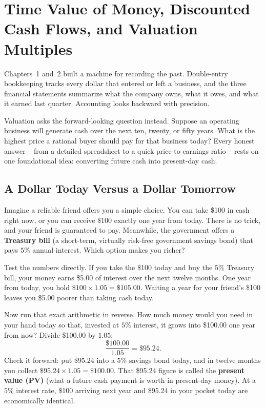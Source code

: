 \chapter{Time Value of Money, Discounted Cash Flows, and Valuation Multiples}
\label{ch:valuation-multiples}
\chapterline

Chapters~1 and~2 built a machine for recording the past. Double-entry bookkeeping tracks every dollar that entered or left a business, and the three financial statements summarize what the company owns, what it owes, and what it earned last quarter. Accounting looks backward with precision.

Valuation asks the forward-looking question instead. Suppose an operating business will generate cash over the next ten, twenty, or fifty years. What is the highest price a rational buyer should pay for that business today? Every honest answer -- from a detailed spreadsheet to a quick price-to-earnings ratio -- rests on one foundational idea: converting future cash into present-day cash.

\section{A Dollar Today Versus a Dollar Tomorrow}

Imagine a reliable friend offers you a simple choice. You can take \$100 in cash right now, or you can receive \$100 exactly one year from today. There is no trick, and your friend is guaranteed to pay. Meanwhile, the government offers a \textbf{Treasury bill} (a short-term, virtually risk-free government savings bond) that pays $5\%$ annual interest. Which option makes you richer?

Test the numbers directly. If you take the \$100 today and buy the $5\%$ Treasury bill, your money earns \$5.00 of interest over the next twelve months. One year from today, you hold $\$100 \times 1.05 = \$105.00$. Waiting a year for your friend's \$100 leaves you \$5.00 poorer than taking cash today.

Now run that exact arithmetic in reverse. How much money would you need in your hand today so that, invested at $5\%$ interest, it grows into \$100.00 one year from now? Divide \$100.00 by $1.05$:
\[
 \frac{\$100.00}{1.05} = \$95.24.
\]
Check it forward: put \$95.24 into a $5\%$ savings bond today, and in twelve months you collect $\$95.24 \times 1.05 = \$100.00$. That \$95.24 figure is called the \textbf{present value (PV)} (what a future cash payment is worth in present-day money). At a $5\%$ interest rate, \$100 arriving next year and \$95.24 in your pocket today are economically identical.

